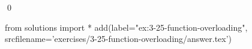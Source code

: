 
\begin{ex}
  \label{ex:3-25-function-overloading}
  
  \qed
\end{ex}
\begin{python0}
from solutions import *
add(label="ex:3-25-function-overloading",
    srcfilename='exercises/3-25-function-overloading/answer.tex')
\end{python0}
